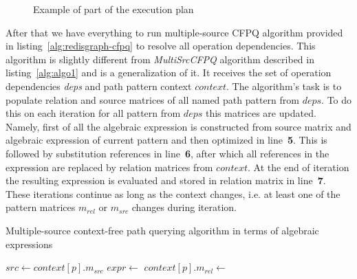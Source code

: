 \begin{figure}[h]
    \centering        
    \caption{Example of part of the execution plan}
    \label{fig:execution-plan-operations}
\end{figure}


After that we have everything to run multiple-source CFPQ algorithm provided in listing~\autoref{alg:redisgraph-cfpq} to resolve all operation dependencies. This algorithm is slightly different from \textit{MultiSrcCFPQ} algorithm described in listing~\autoref{alg:algo1} and is a generalization of it. It receives the set of operation dependencies \textit{deps} and path pattern context $context$. The algorithm's task is to populate relation and source matrices of all named path pattern from $deps$. To do this on each iteration for all pattern from $deps$ this matrices are updated. Namely, first of all the algebraic expression is constructed from source matrix and algebraic expression of current pattern and then optimized in line~\textbf{5}. This is followed by substitution references in line~\textbf{6}, after which all references in the expression are replaced by relation matrices from $context$. At the end of iteration the resulting expression is evaluated and stored in relation matrix in line~\textbf{7}. These iterations continue as long as the context changes, i.e. at least one of the pattern matrices $m_{rel}$ or $m_{src}$ changes during iteration.

\begin{algorithm}
\begin{algorithmic}[1]
\caption{Multiple-source context-free path querying algorithm in terms of algebraic expressions}
\label{alg:redisgraph-cfpq}
        \State $src \gets context[p].m_{src}$
        \State $expr \gets$ 
        \State {}
        \State $context[p].m_{rel} \gets$ 
    \EndFor
\EndWhile

\EndFunction
\end{algorithmic}
\end{algorithm}

